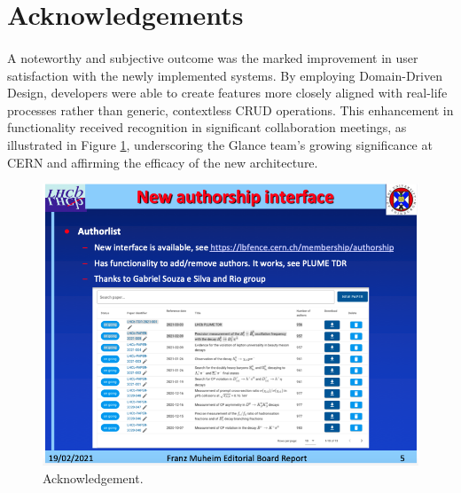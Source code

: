 \section{Acknowledgements}

\paragraph{} A noteworthy and subjective outcome was the marked improvement in user satisfaction with the newly implemented systems. By employing Domain-Driven Design, developers were able to create features more closely aligned with real-life processes rather than generic, contextless CRUD operations. This enhancement in functionality received recognition in significant collaboration meetings, as illustrated in Figure \ref{fig:reconhecimentos}, underscoring the Glance team's growing significance at CERN and affirming the efficacy of the new architecture.

\begin{figure}[H]
    \centering
    \includegraphics[width=1\linewidth]{figuras/reconhecimentos.png}
    \caption{Acknowledgement.}
    \label{fig:reconhecimentos}
\end{figure}



